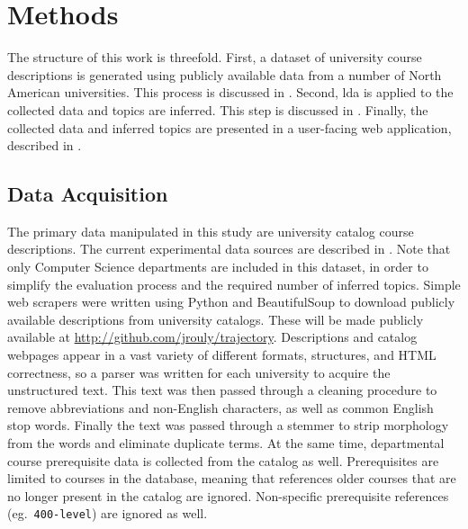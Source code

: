 \section{Methods}
\label{sec:methods}


The structure of this work is threefold.
First, a dataset of university course descriptions is generated using publicly available data from a number of North American universities.
This process is discussed in .
Second, \ac{lda} is applied to the collected data and topics are inferred.
This step is discussed in .
Finally, the collected data and inferred topics are presented in a user-facing web application, described in .


\subsection{Data Acquisition}
\label{sec:data-acquisition}


The primary data manipulated in this study are university catalog course descriptions.
The current experimental data sources are described in .
Note that only Computer Science departments are included in this dataset, in order to simplify the evaluation process and the required number of inferred topics.
Simple web scrapers were written using Python and BeautifulSoup to download publicly available descriptions from university catalogs.
These will be made publicly available at \url{http://github.com/jrouly/trajectory}.
Descriptions and catalog webpages appear in a vast variety of different formats, structures, and HTML correctness, so a parser was written for each university to acquire the unstructured text.
This text was then passed through a cleaning procedure to remove abbreviations and non-English characters, as well as common English stop words.
Finally the text was passed through a stemmer to strip morphology from the words and eliminate duplicate terms.
At the same time, departmental course prerequisite data is collected from the catalog as well.
Prerequisites are limited to courses in the database, meaning that references older courses that are no longer present in the catalog are ignored.
Non-specific prerequisite references (eg.\ \texttt{400-level}) are ignored as well.

